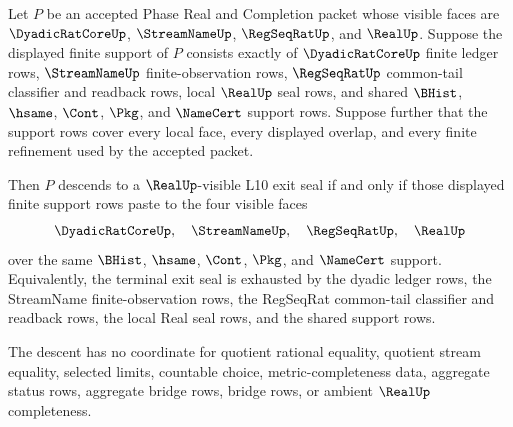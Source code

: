 \begin{theorem}
\label{thm:real-l10-exit-finite-support-descent}
Let $P$ be an accepted Phase Real and Completion packet whose visible faces are $\DyadicRatCoreUp$, $\StreamNameUp$, $\RegSeqRatUp$, and $\RealUp$. Suppose the displayed finite support of $P$ consists exactly of $\DyadicRatCoreUp$ finite ledger rows, $\StreamNameUp$ finite-observation rows, $\RegSeqRatUp$ common-tail classifier and readback rows, local $\RealUp$ seal rows, and shared $\BHist$, $\hsame$, $\Cont$, $\Pkg$, and $\NameCert$ support rows. Suppose further that the support rows cover every local face, every displayed overlap, and every finite refinement used by the accepted packet.

Then $P$ descends to a $\RealUp$-visible L10 exit seal if and only if those displayed finite support rows paste to the four visible faces
$$
\DyadicRatCoreUp,\quad \StreamNameUp,\quad \RegSeqRatUp,\quad \RealUp
$$
over the same $\BHist$, $\hsame$, $\Cont$, $\Pkg$, and $\NameCert$ support. Equivalently, the terminal exit seal is exhausted by the dyadic ledger rows, the StreamName finite-observation rows, the RegSeqRat common-tail classifier and readback rows, the local Real seal rows, and the shared support rows.

The descent has no coordinate for quotient rational equality, quotient stream equality, selected limits, countable choice, metric-completeness data, aggregate status rows, aggregate bridge rows, bridge rows, or ambient $\RealUp$ completeness.
\end{theorem}

